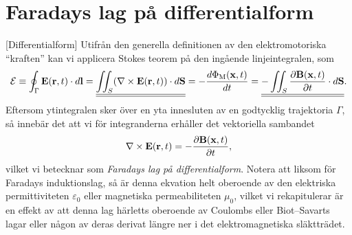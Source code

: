 {{{{\section{Faradays lag p{\aa} differentialform}
[Differentialform]
Utifr{\aa}n den generella definitionen av den elektromotoriska ``kraften''
kan vi applicera Stokes teorem p{\aa} den ing{\aa}ende linjeintegralen, som
$$
  {\cal E}
    \equiv\oint_{\Gamma}{\bf E}({\bf r},t)\cdot d{\bf l}
    =\underline{\underline{
        \iint_{S}(\nabla\times{\bf E}({\bf r},t))\cdot d{\bf S}
     }}
    =-{{d\Phi_{\rm M}({\bf x},t)}\over{dt}}
    =\underline{\underline{
        -\iint_S{{\partial{\bf B}({\bf x},t)}\over{\partial t}}\cdot d{\bf S}
     }}.
$$
Eftersom ytintegralen sker {\"o}ver en yta innesluten av en godtycklig
trajektoria $\Gamma$, s{\aa} inneb{\"a}r det att vi f{\"o}r integranderna
erh{\aa}ller det vektoriella sambandet
$$
  \nabla\times{\bf E}({\bf r},t)
    =-{{\partial{\bf B}({\bf x},t)}\over{\partial t}},
$$
vilket vi betecknar som {\it Faradays lag p{\aa} differentialform}.
Notera att liksom f{\"o}r Faradays induktionslag, s{\aa} {\"a}r denna ekvation
helt oberoende av den elektriska permittiviteten $\varepsilon_0$ eller
magnetiska permeabiliteten $\mu_0$, vilket vi rekapitulerar {\"a}r en effekt
av att denna lag h{\"a}rletts oberoende av Coulombs eller Biot--Savarts lagar
eller n{\aa}gon av deras derivat l{\"a}ngre ner i det elektromagnetiska
sl{\"a}kttr{\"a}det.
\vfill\eject

}}}}
